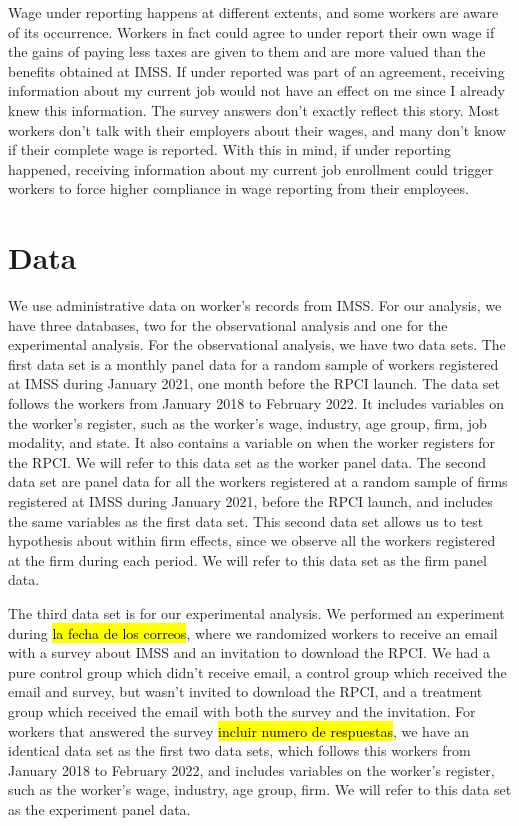 \documentclass[oneside,11pt]{article}
\begin{document}
Wage under reporting happens at different extents, and some workers are aware of its occurrence. Workers in fact could agree to under report their own wage if the gains of paying less taxes are given to them and are more valued than the benefits obtained at IMSS. If under reported was part of an agreement, receiving information about my current job would not have an effect on me since I already knew this information. The survey answers don't exactly reflect this story. Most workers don't talk with their employers about their wages, and many don't know if their complete wage is reported. With this in mind, if under reporting happened, receiving information about my current job enrollment could trigger workers to force higher compliance in wage reporting from their employees.

\section{Data}

We use administrative data on worker's records from IMSS. For our analysis, we have three databases, two for the observational analysis and one for the experimental analysis. For the observational analysis, we have two data sets. The first data set is a monthly panel data for a random sample of workers registered at IMSS during January 2021, one month before the RPCI launch. The data set follows the workers from January 2018 to February 2022. It includes variables on the worker's register, such as the worker's wage, industry, age group, firm, job modality, and state. It also contains a variable on when the worker registers for the RPCI. We will refer to this data set as the worker panel data. The second data set are panel data for all the workers registered at a random sample of firms registered at IMSS during January 2021, before the RPCI launch, and includes the same variables as the first data set. This second data set allows us to test hypothesis about within firm effects, since we observe all the workers registered at the firm during each period. We will refer to this data set as the firm panel data.

The third data set is for our experimental analysis. We performed an experiment during \hl{la fecha de los correos}, where we randomized workers to receive an email with a survey about IMSS and an invitation to download the RPCI. We had a pure control group which didn't receive email, a control group which received the email and survey, but wasn't invited to download the RPCI, and a treatment group which received the email with both the survey and the invitation. For workers that answered the survey \hl{incluir numero de respuestas}, we have an identical data set as the first two data sets, which follows this workers from January 2018 to February 2022, and includes variables on the worker's register, such as the worker's wage, industry, age group, firm. We will refer to this data set as the experiment panel data.
\end{document}
